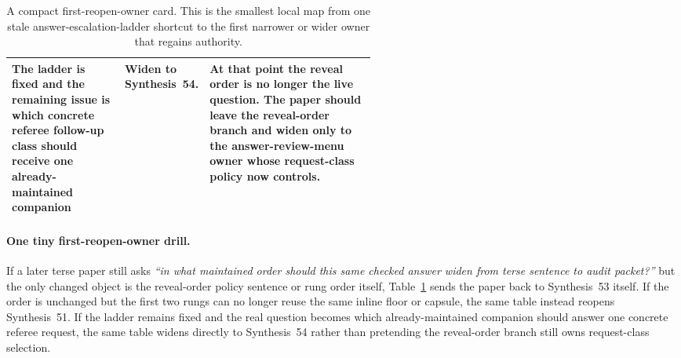 \documentclass[11pt]{article}
\begin{document}
\begin{table}[t]
\begin{tabularx}{\linewidth}{@{}p{0.31\linewidth}p{0.23\linewidth}X@{}}
The ladder is fixed and the remaining issue is which concrete referee follow-up class should receive one already-maintained companion & Widen to Synthesis~54. & At that point the reveal order is no longer the live question. The paper should leave the reveal-order branch and widen only to the answer-review-menu owner whose request-class policy now controls. \\
\bottomrule
\end{tabularx}
\caption{A compact first-reopen-owner card. This is the smallest local map from one stale answer-escalation-ladder shortcut to the first narrower or wider owner that regains authority.}
\label{tab:first-reopen-owner-card-answer-escalation-ladder}
\end{table}

\paragraph{One tiny first-reopen-owner drill.}
If a later terse paper still asks \emph{``in what maintained order should this same checked answer widen from terse sentence to audit packet?''} but the only changed object is the reveal-order policy sentence or rung order itself, Table~\ref{tab:first-reopen-owner-card-answer-escalation-ladder} sends the paper back to Synthesis~53 itself. If the order is unchanged but the first two rungs can no longer reuse the same inline floor or capsule, the same table instead reopens Synthesis~51. If the ladder remains fixed and the real question becomes which already-maintained companion should answer one concrete referee request, the same table widens directly to Synthesis~54 rather than pretending the reveal-order branch still owns request-class selection.\cite{series:workedexample,series:challengeanswerpublicationprofiles,series:challengeanswerreviewmenus}
\end{document}
